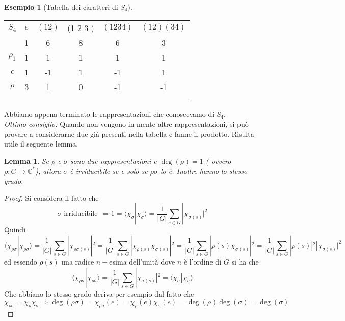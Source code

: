 \documentclass[11pt]{article}
\theoremstyle{plain}
\newtheorem{lemma}[thm]{Lemma}
\theoremstyle{definition}
\newtheorem{exmp}{Esempio}[section]
\theoremstyle{remark}
\begin{document}
\begin{exmp}[Tabella dei caratteri di $S_4$]
\begin{table}[!ht]
\centering
\begin{tabular}{|c|c|c|c|c|c|}
\hline
$S_4$  & $e$ & $(1 2)$ & (1 2 3 ) & $(1 2 3 4)$ & $(1 2)(3 4)$ \\
 & 1 & 6 & 8 & 6 & 3 \\
\hline
 $\rho_1$ & 1 & 1  & 1 & 1 & 1\\
\hline
$\epsilon$ & 1  & -1 & 1 & -1 & 1 \\
\hline
$\rho$& 3 & 1 & 0 & -1 & -1\\
\hline
& &  & & & \\
\hline
& &  & & & \\
\hline
\end{tabular}
\end{table}

Abbiamo appena terminato le rappresentazioni che conoscevamo di $S_4$.\\
\emph{Ottimo consiglio:} Quando non vengono in mente altre rappresentazioni, si può provare a considerarne due già presenti nella tabella e fanne il prodotto. Risulta utile il seguente lemma.

\begin{lemma}
Se $\rho$ e $\sigma$ sono due rappresentazioni e $\deg(\rho)=1$ ( ovvero $\rho:G\rightarrow \mathbb{C}^*$), allora $\sigma$ è irriducibile se e solo se $\rho\sigma$ lo è. Inoltre hanno lo stesso grado.
\end{lemma}

\begin{proof}
Si considera il fatto che
\[ \sigma \text{ irriducibile } \Leftrightarrow 1=\langle\chi_{\sigma}|\chi_{\sigma}\rangle=\frac{1}{|G|}\sum_{s\in G}|\chi_{\sigma(s)}|^2 \]
Quindi
\[ \langle \chi_{\rho\sigma}|\chi_{\rho\sigma}\rangle=\frac{1}{|G|}\sum_{s\in G}|\chi_{\rho\sigma(s)}|^2=\frac{1}{|G|}\sum_{s\in G}|\chi_{\rho(s)}\chi_{\sigma(s)}|^2=\frac{1}{|G|}\sum_{s\in G}|\rho(s)\chi_{\sigma(s)}|^2=\frac{1}{|G|}\sum_{s\in G}|\rho(s)|^2|\chi_{\sigma(s)}|^2 \]
ed essendo $\rho(s)$ una radice $n-$esima dell'unità dove $n$ è l'ordine di $G$ si ha che
\[
\langle \chi_{\rho\sigma}|\chi_{\rho\sigma}\rangle=\frac{1}{|G|}\sum_{s\in G}
|\chi_{\sigma(s)}|^2=\langle \chi_{\sigma}|\chi_{\sigma}\rangle
\]
Che abbiano lo stesso grado deriva per esempio dal fatto che
\[ \chi_{\rho\sigma}=\chi_{\rho}\chi_{\sigma}\Rightarrow \deg(\rho\sigma)=\chi_{\rho\sigma}(e)=\chi_{\rho}(e)\chi_{\sigma}(e)=\deg(\rho)\deg(\sigma)=\deg(\sigma) \]
\end{proof}


\end{exmp}
\end{document}

